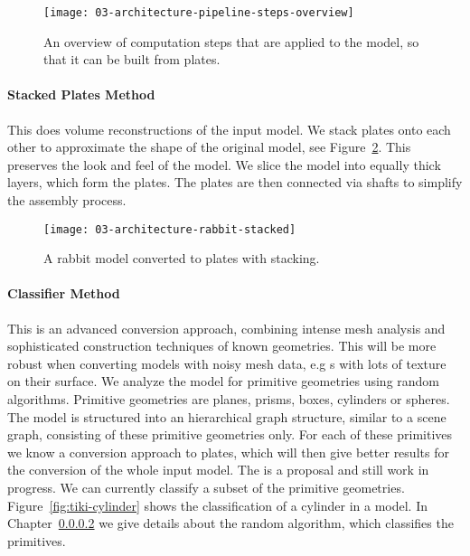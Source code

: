 \documentclass[../../ClassicThesis.tex]{subfiles}
\begin{document}

\begin{figure}[h]
  \centering
  \texttt{[image: 03-architecture-pipeline-steps-overview]}
  \caption{An overview of computation steps that are applied
    to the model, so that it can be built from plates.}
  \label{fig:overview-plate-steps}
\end{figure}



\paragraph{Stacked Plates Method}

This \class{\fabmethod} does volume reconstructions of the
input model. We stack plates onto each other to approximate
the shape of the original model, see
Figure~\ref{fig:stacked-rabbit}. This preserves the look and
feel of the model. We slice the model into equally thick
layers, which form the plates. The plates are then connected
via shafts to simplify the assembly process.

\begin{figure}[h]
  \centering
  \texttt{[image: 03-architecture-rabbit-stacked]}
  \caption{A rabbit model converted to plates with
    stacking.}
  \label{fig:stacked-rabbit}
\end{figure}

\paragraph{Classifier Method}

This is an advanced conversion approach, combining intense
mesh analysis and sophisticated construction techniques of
known geometries. This \class{\fabmethod} will be more
robust when converting models with noisy mesh data, e.g
{\threedmodel}s with lots of texture on their surface. We
analyze the model for primitive geometries using random
algorithms. Primitive geometries are planes, prisms, boxes,
cylinders or spheres. The model is structured into an
hierarchical graph structure, similar to a scene graph,
consisting of these primitive geometries only. For each of
these primitives we know a conversion approach to plates,
which will then give better results for the conversion of
the whole input model. The  is a
proposal and still work in progress. We can currently
classify a subset of the primitive geometries.
Figure~\ref{fig:tiki-cylinder} shows the classification of a
cylinder in a model. In Chapter~\ref{}  we give details about the random algorithm,
which classifies the primitives.
\end{document}
